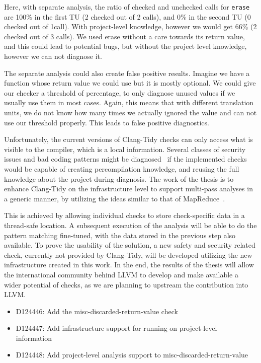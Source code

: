 Here, with separate analysis, the ratio of checked and unchecked calls for \texttt{erase} are 100\% in the first TU (2 checked out of 2 calls),
and 0\% in the second TU (0 checked out of 1call). With project-level knowledge, however we
would get 66\%  (2 checked out of 3 calls). We used erase without a care towards its return value, and this could lead to potential bugs, but without the project
level knowledge, however we can not diagnose it.

The separate analysis could also create false positive results. Imagine we have a function whose return value we could use but it is mostly
optional. We could give our checker a threshold of percentage, to only diagnose unused values if we usually use them in most cases. Again, this
means that with different translation units, we do not know how many times we actually ignored the value and can not use our threshold properly.
This leads to false positive diagnostics.

Unfortunately, the current versions of Clang-Tidy checks can only access what is visible to the compiler, which is a local information.
Several classes of security issues and bad coding patterns might be diagnosed~\cite{googlearticle} if the implemented checks would be 
capable of creating percompilation knowledge, and reusing the full knowledge about the project during diagnosis.
The work of the thesis is to enhance Clang-Tidy on the infrastructure level to support multi-pass analyses in a generic manner, by 
utilizing the ideas similar to that of MapReduce~\cite{mapreduce}.

This is achieved by allowing individual checks to store check-specific data in a thread-safe location.
A subsequent execution of the analysis will be able to do the pattern matching fine-tuned, with the data stored in the previous step also
available.
To prove the usability of the solution, a new safety and security related check, currently not provided by Clang-Tidy, will be developed
utilizing the new infrastructure created in this work.
In the end, the results of the thesis will allow the international community behind LLVM to develop and make available a wider potential of
checks, as we are planning to upstream the contribution into LLVM. 

\begin{itemize}
    \item D124446: Add the misc-discarded-return-value check~\cite{upstream1}
    \item D124447: Add infrastructure support for running on project-level information~\cite{upstream2}
    \item D124448: Add project-level analysis support to misc-discarded-return-value~\cite{upstream3}
\end{itemize}

